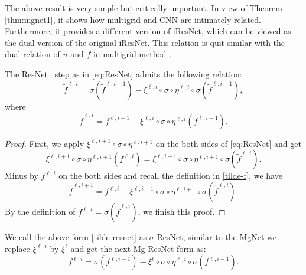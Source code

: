 The above result is very simple but critically important.
In view of Theorem \ref{thm:mgnet1}, it shows how multigrid and 
CNN are intimately related. Furthermore, it provides a different version
of iResNet, which can be viewed as the dual version of the original iResNet.
This relation is quit similar with the dual relation of $u$ and $f$
in multigrid method \cite{xu2017algebraic}.
\begin{lemma}\label{thm:mgnet2} 
	The ResNet~\cite{he2016deep} step
 	 as in \eqref{eq:ResNet} 
admits the following relation:
\begin{equation}\label{tilde-resnet}
\tilde f^{\ell,i} =\sigma(\tilde f^{\ell,i-1}) -
\xi^{\ell,i} \circ \sigma \circ \eta^{\ell,i}\circ \sigma( \tilde f^{\ell,i-1}),
\end{equation}
where
\begin{equation}\label{tilde-f}
\tilde f^{\ell,i} = f^{\ell, i-1} -\xi^{\ell,i} \circ \sigma \circ \eta^{\ell,i} (f^{\ell,i-1}).
\end{equation}
\end{lemma}
\begin{proof}
	First, we apply $ \xi^{\ell,i+1} \circ \sigma \circ \eta^{\ell,i+1}$ 
	on the both sides of \eqref{eq:ResNet} and get
	\begin{equation}\label{resnet1}
	\xi^{\ell,i+1} \circ \sigma \circ \eta^{\ell,i+1}( f^{\ell,i} ) = 
	\xi^{\ell,i+1} \circ \sigma \circ \eta^{\ell,i+1}\circ \sigma( \tilde f^{\ell,i} ).
	\end{equation}
	Minus by $f^{\ell,i}$ on the both sides and recall the definition in \eqref{tilde-f}, we have
	\begin{equation*}
	\tilde f^{\ell,i+1} = f^{\ell,i} - \xi^{\ell,i+1} \circ \sigma \circ \eta^{\ell,i+1}\circ \sigma( \tilde f^{\ell,i}).
	\end{equation*}
	By the definition of $f^{\ell,i} = \sigma(\tilde f^{\ell,i})$, we finish this proof.
\end{proof}

We call the above form \eqref{tilde-resnet} as
$\sigma$-ResNet, similar to the MgNet we replace $\xi^{\ell,i}$ by $\xi^{\ell}$  and get 
the next Mg-ResNet form as:
\begin{equation}\label{mg-resnet}
f^{\ell,i} =\sigma(f^{\ell,i-1}) -
\xi^{\ell} \circ \sigma \circ \eta^{\ell,i}\circ \sigma(f^{\ell,i-1}).
\end{equation}

